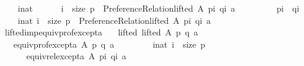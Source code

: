 \begin{isabellebody}
\ \ \ \ {\isacharparenleft}{\kern0pt}{\isasymforall}i{\isacharcolon}{\kern0pt}{\isacharcolon}{\kern0pt}nat{\isachardot}{\kern0pt}\isanewline
\ \ \ \ \ \ {\isacharparenleft}{\kern0pt}i\ {\isacharless}{\kern0pt}\ size\ p\ {\isasymand}\ {\isasymnot}Preference{\isacharunderscore}{\kern0pt}Relation{\isachardot}{\kern0pt}lifted\ A\ {\isacharparenleft}{\kern0pt}p{\isacharbang}{\kern0pt}i{\isacharparenright}{\kern0pt}\ {\isacharparenleft}{\kern0pt}q{\isacharbang}{\kern0pt}i{\isacharparenright}{\kern0pt}\ a{\isacharparenright}{\kern0pt}\ {\isasymlongrightarrow}\isanewline
\ \ \ \ \ \ \ \ {\isacharparenleft}{\kern0pt}p{\isacharbang}{\kern0pt}i{\isacharparenright}{\kern0pt}\ {\isacharequal}{\kern0pt}\ {\isacharparenleft}{\kern0pt}q{\isacharbang}{\kern0pt}i{\isacharparenright}{\kern0pt}{\isacharparenright}{\kern0pt}\ {\isasymand}\isanewline
\ \ \ \ {\isacharparenleft}{\kern0pt}{\isasymexists}i{\isacharcolon}{\kern0pt}{\isacharcolon}{\kern0pt}nat{\isachardot}{\kern0pt}\ i\ {\isacharless}{\kern0pt}\ size\ p\ {\isasymand}\ Preference{\isacharunderscore}{\kern0pt}Relation{\isachardot}{\kern0pt}lifted\ A\ {\isacharparenleft}{\kern0pt}p{\isacharbang}{\kern0pt}i{\isacharparenright}{\kern0pt}\ {\isacharparenleft}{\kern0pt}q{\isacharbang}{\kern0pt}i{\isacharparenright}{\kern0pt}\ a{\isacharparenright}{\kern0pt}{\isachardoublequoteclose}\isanewline
\isanewline
{}\isamarkupfalse%
\ lifted{\isacharunderscore}{\kern0pt}imp{\isacharunderscore}{\kern0pt}equiv{\isacharunderscore}{\kern0pt}prof{\isacharunderscore}{\kern0pt}except{\isacharunderscore}{\kern0pt}a{\isacharcolon}{\kern0pt}\isanewline
\ \ \ lifted{\isacharcolon}{\kern0pt}\ {\isachardoublequoteopen}lifted\ A\ p\ q\ a{\isachardoublequoteclose}\isanewline
\ \ \ {\isachardoublequoteopen}equiv{\isacharunderscore}{\kern0pt}prof{\isacharunderscore}{\kern0pt}except{\isacharunderscore}{\kern0pt}a\ A\ p\ q\ a{\isachardoublequoteclose}\isanewline
%
\isadelimproof
%
\endisadelimproof
%
\isatagproof
{}\isamarkupfalse%
\ {\isacharminus}{\kern0pt}\isanewline
\ \ \isamarkupfalse%
\isanewline
\ \ \ \ {\isachardoublequoteopen}{\isasymforall}i{\isacharcolon}{\kern0pt}{\isacharcolon}{\kern0pt}nat{\isachardot}{\kern0pt}\ i\ {\isacharless}{\kern0pt}\ size\ p\ {\isasymlongrightarrow}\isanewline
\ \ \ \ \ \ equiv{\isacharunderscore}{\kern0pt}rel{\isacharunderscore}{\kern0pt}except{\isacharunderscore}{\kern0pt}a\ A\ {\isacharparenleft}{\kern0pt}p{\isacharbang}{\kern0pt}i{\isacharparenright}{\kern0pt}\ {\isacharparenleft}{\kern0pt}q{\isacharbang}{\kern0pt}i{\isacharparenright}{\kern0pt}\ a{\isachardoublequoteclose}\isanewline

\end{isabellebody}
